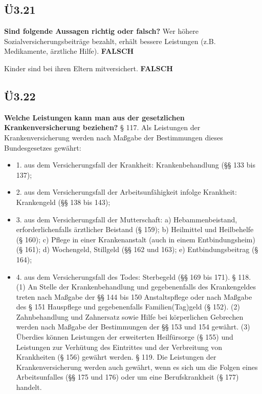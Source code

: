 	\subsection{Ü3.21}
		 \textbf{Sind folgende Aussagen richtig oder falsch?} \newline
		 Wer höhere Sozialversicherungsbeiträge bezahlt, erhält bessere Leistungen
		 (z.B. Medikamente, ärztliche Hilfe).  \textbf{FALSCH}
		 
		 Kinder sind bei ihren Eltern mitversichert.  \textbf{FALSCH}

	\subsection{Ü3.22}
		\textbf{Welche Leistungen kann man aus der gesetzlichen Krankenversicherung beziehen? }
		§ 117. Als Leistungen der Krankenversicherung werden nach Maßgabe der Bestimmungen dieses Bundesgesetzes gewährt:
		\begin{itemize}
			\item 	1. aus dem Versicherungsfall der Krankheit: Krankenbehandlung (§§ 133 bis 137);
			\item 	2. aus dem Versicherungsfall der Arbeitsunfähigkeit infolge Krankheit: Krankengeld (§§ 138 bis 143);
			\item 	3. aus dem Versicherungsfall der Mutterschaft:
				\subitem 	a) Hebammenbeistand, erforderlichenfalls ärztlicher Beistand (§ 159);
				\subitem	b) Heilmittel und Heilbehelfe (§ 160);
				\subitem	c) Pflege in einer Krankenanstalt (auch in einem Entbindungsheim) (§ 161);
				\subitem	d) Wochengeld, Stillgeld (§§ 162 und 163);
				\subitem	e) Entbindungsbeitrag (§ 164);
			\item	4. aus dem Versicherungsfall des Todes: Sterbegeld (§§ 169 bis 171).
			§ 118. (1) An Stelle der Krankenbehandlung und gegebenenfalls des Krankengeldes treten nach Maßgabe der §§ 144 bis
			150 Anstaltspflege oder nach Maßgabe des § 151 Hauspflege und gegebenenfalls Familien(Tag)geld (§ 152).
				 \subitem	(2) Zahnbehandlung und Zahnersatz sowie Hilfe bei körperlichen Gebrechen werden nach Maßgabe der Bestimmungen
				 der §§ 153 und 154 gewährt.
				 \subitem	(3) Überdies können Leistungen der erweiterten Heilfürsorge (§ 155) und Leistungen zur Verhütung des Eintrittes
				 und der Verbreitung von Krankheiten (§ 156) gewährt werden.
				 § 119. Die Leistungen der Krankenversicherung werden auch gewährt, wenn es sich um die Folgen eines Arbeitsunfalles (§§ 175 und 176) oder um eine Berufskrankheit (§ 177) handelt.
		\end{itemize}
		
